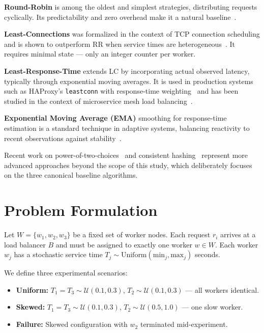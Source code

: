 \documentclass[conference]{IEEEtran}
\begin{document}
\textbf{Round-Robin} is among the oldest and simplest strategies, distributing requests cyclically. Its predictability and zero overhead make it a natural baseline~\cite{tanenbaum2017}.

\textbf{Least-Connections} was formalized in the context of TCP connection scheduling and is shown to outperform RR when service times are heterogeneous~\cite{breslau1999}. It requires minimal state --- only an integer counter per worker.

\textbf{Least-Response-Time} extends LC by incorporating actual observed latency, typically through exponential moving averages. It is used in production systems such as HAProxy's \texttt{leastconn} with response-time weighting~\cite{haproxy2024} and has been studied in the context of microservice mesh load balancing~\cite{klein2014}.

\textbf{Exponential Moving Average (EMA)} smoothing for response-time estimation is a standard technique in adaptive systems, balancing reactivity to recent observations against stability~\cite{brown1963}.

Recent work on power-of-two-choices~\cite{mitzenmacher2001} and consistent hashing~\cite{karger1997} represent more advanced approaches beyond the scope of this study, which deliberately focuses on the three canonical baseline algorithms.

\section{Problem Formulation}

Let $W = \{w_1, w_2, w_3\}$ be a fixed set of worker nodes. Each request $r_i$ arrives at a load balancer $B$ and must be assigned to exactly one worker $w \in W$. Each worker $w_j$ has a stochastic service time $T_j \sim \text{Uniform}(\text{min}_j, \text{max}_j)$ seconds.

We define three experimental scenarios:
\begin{itemize}
  \item \textbf{Uniform:} $T_1 = T_3 \sim \mathcal{U}(0.1, 0.3)$, $T_2 \sim \mathcal{U}(0.1, 0.3)$ --- all workers identical.
  \item \textbf{Skewed:} $T_1 = T_3 \sim \mathcal{U}(0.1, 0.3)$, $T_2 \sim \mathcal{U}(0.5, 1.0)$ --- one slow worker.
  \item \textbf{Failure:} Skewed configuration with $w_2$ terminated mid-experiment.
\end{itemize}
\end{document}
